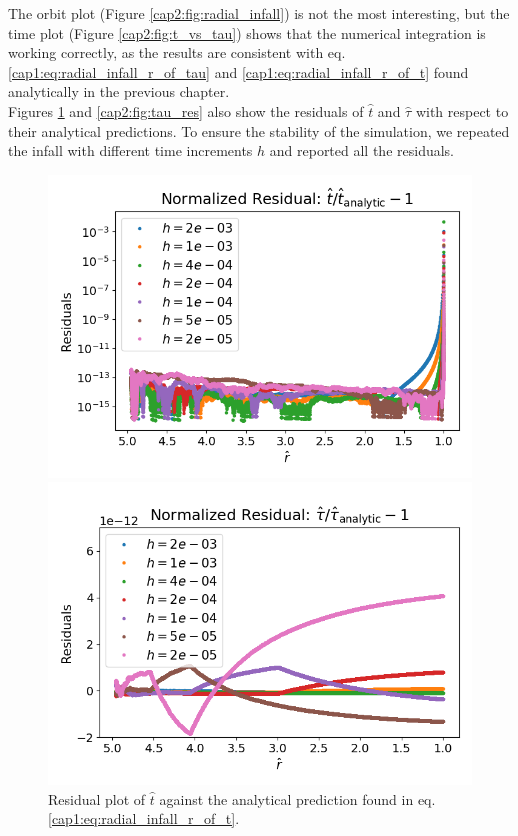 The orbit plot (Figure \ref{cap2:fig:radial_infall}) is not the most
interesting, but the time plot (Figure \ref{cap2:fig:t_vs_tau}) shows that the
numerical integration is working correctly, as the results are consistent with
eq. \ref{cap1:eq:radial_infall_r_of_tau} and \ref{cap1:eq:radial_infall_r_of_t}
found analytically in the previous chapter. \\
Figures \ref{cap2:fig:t_res} and \ref{cap2:fig:tau_res} also show the residuals
of $\hat t$ and $\hat \tau$ with respect to their analytical predictions.
To ensure the stability of the simulation, we repeated the infall with different
time increments $h$ and reported all the residuals.

\begin{figure}[h]
    \begin{minipage}{0.48\textwidth}
        \centering
        \includegraphics[width=\textwidth]{Figures/chapter2/t_res_multi.png}
        \caption{Residual plot of $\hat t$ against the analytical prediction
        found in eq. \ref{cap1:eq:radial_infall_r_of_t}.}
        \label{cap2:fig:t_res}
    \end{minipage}
    \hspace{0.015 \textwidth}
    \begin{minipage}{0.48\textwidth}
        \centering
        \includegraphics[width=\textwidth]{Figures/chapter2/tau_res_multi.png}

\end{minipage}
\end{figure}
